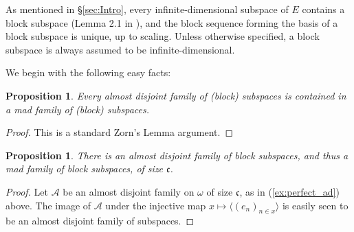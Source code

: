 \documentclass[11pt]{amsart}
\newcommand{\LA}{\mathcal{A}}
\newtheorem{prop}[thm]{Proposition}
\theoremstyle{definition}
\newtheorem{defn}[thm]{Definition}
\theoremstyle{remark}
\renewcommand{\1}{\mathbf{1}}
\newcommand{\cc}{\mathfrak{c}}
\begin{document}
As mentioned in \S\ref{sec:Intro}, every infinite-dimensional subspace of $E$ contains a block subspace (Lemma 2.1 in \cite{MR3864398}), and the block sequence forming the basis of a block subspace is unique, up to scaling. Unless otherwise specified, a block subspace is always assumed to be infinite-dimensional.

We begin with the following easy facts:

\begin{prop}
	Every almost disjoint family of (block) subspaces is contained in a mad family of (block) subspaces.	
\end{prop}

\begin{proof}
	This is a standard Zorn's Lemma argument.
\end{proof}

\begin{prop}
	There is an almost disjoint family of block subspaces, and thus a mad family of block subspaces, of size $\cc$.	
\end{prop}

\begin{proof}
	Let $\LA$ be an almost disjoint family on $\omega$ of size $\cc$, as in (\ref{ex:perfect_ad}) above. The image of $\LA$ under the injective map $x\mapsto\langle(e_n)_{n\in x}\rangle$ is easily seen to be an almost disjoint family of subspaces.
\end{proof}


%

\end{document}
